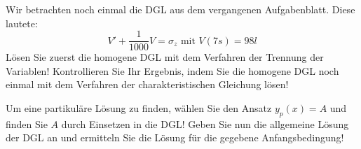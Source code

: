 \item Wir betrachten noch einmal die DGL aus dem vergangenen Aufgabenblatt. Diese lautete:
$$V' + \frac{1}{1000}V = \sigma_z  \text{ mit } V(7s)=98l$$
Lösen Sie zuerst die homogene DGL mit dem Verfahren der Trennung der Variablen! Kontrollieren Sie Ihr Ergebnis, indem Sie die homogene DGL noch einmal mit dem Verfahren der charakteristischen Gleichung lösen!

Um eine partikuläre Lösung zu finden, wählen Sie den Ansatz $y_p(x) = A$ und finden Sie $A$ durch Einsetzen in die DGL! Geben Sie nun die allgemeine Lösung der DGL an und ermitteln Sie die Lösung für die gegebene Anfangsbedingung!
